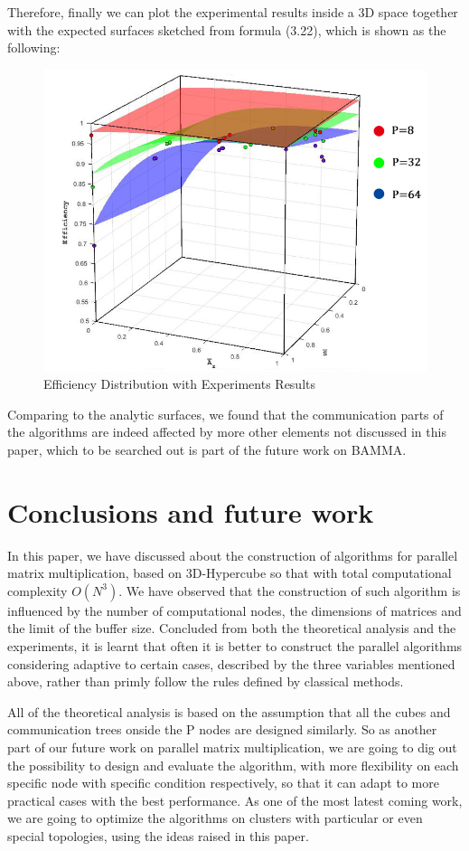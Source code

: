 \documentclass{amsart}
\theoremstyle{definition}
\theoremstyle{remark}
\numberwithin{equation}{section}
\begin{document}
Therefore, finally we can plot the experimental results inside a 3D space together with the expected surfaces sketched from formula (3.22), which is shown as the following:
\begin{figure}[h]
	\includegraphics[scale=0.7]{figures/Efficieny.png}
	\caption{Efficiency Distribution with Experiments Results}
\end{figure}


Comparing to the analytic surfaces, we found that the communication parts of the algorithms are indeed affected by more other elements not discussed in this paper, which to be searched out is part of the future work on BAMMA.
\section{Conclusions and future work}
	In this paper, we have discussed about the construction of algorithms for parallel matrix multiplication, based on 3D-Hypercube so that with total computational complexity $O(N^3)$. We have observed that the construction of such algorithm is influenced by the number of computational nodes, the dimensions of matrices and the limit of the buffer size. Concluded from both the theoretical analysis and the experiments, it is learnt that often it is better to construct the parallel algorithms considering adaptive to certain cases, described by the three variables mentioned above, rather than primly follow the rules defined by classical methods.
	
	All of the theoretical analysis is based on the assumption that all the cubes and communication trees onside the P nodes are designed similarly. So as another part of our future work on parallel matrix multiplication, we are going to dig out the possibility to design and evaluate the algorithm, with more flexibility on each specific node with specific condition respectively, so that it can adapt to more practical cases with the best performance. As one of the most latest coming work, we are going to optimize the algorithms on clusters with particular or even special topologies, using the ideas raised in this paper.
	
\end{document}
